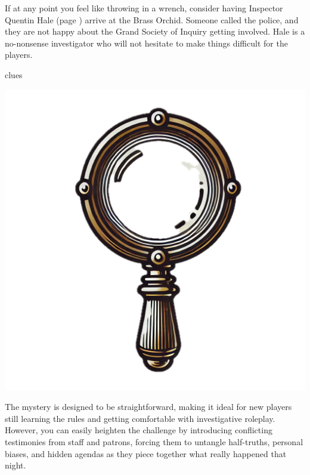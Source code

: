 \vspace{\baselineskip}
\begin{GmTips}
	If at any point you feel like throwing in a wrench, consider having Inspector Quentin Hale (page \pageref{npc:inspector-hale}) arrive at the Brass Orchid. Someone called the police, and they are not happy about the Grand Society of Inquiry getting involved. Hale is a no-nonsense investigator who will not hesitate to make things difficult for the players.
\end{GmTips}

\newcolumn
{clues}

\begin{center}
	\includegraphics[width=.5\linewidth]{img/separt/detective-glass}
\end{center}

\begin{GmTips}
	The mystery is designed to be straightforward, making it ideal for new players still learning the rules and getting comfortable with investigative roleplay. However, you can easily heighten the challenge by introducing conflicting testimonies from staff and patrons, forcing them to untangle half-truths, personal biases, and hidden agendas as they piece together what really happened that night.
\end{GmTips}

